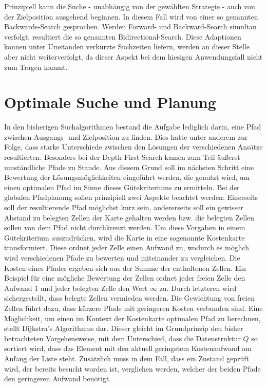 Prinzipiell kann die Suche - unabhängig von der gewählten Strategie - auch von der Zielposition ausgehend beginnen. In diesem Fall wird von einer so genannten Backwards-Search gesprochen. Werden Forward- und Backward-Search simultan verfolgt, resultiert die so genannten Bidirectional-Search. Diese Adaptionen können unter Umständen verkürzte Suchzeiten liefern, werden an dieser Stelle aber nicht weiterverfolgt, da dieser Aspekt bei dem hiesigen Anwendungsfall nicht zum Tragen kommt.

\section{Optimale Suche und Planung}
In den bisherigen Suchalgorithmen bestand die Aufgabe lediglich darin, eine Pfad zwischen Ausgangs- und Zielposition zu finden. Dies hatte unter anderem zur Folge, dass starke Unterschiede zwischen den Lösungen der verschiedenen Ansätze resultierten. Besonders bei der Depth-First-Search kamen zum Teil äußerst umständliche Pfade zu Stande. Aus diesem Grund soll im nächsten Schritt eine Bewertung der Lösungsmöglichkeiten eingeführt werden, die genutzt wird, um einen optimalen Pfad im Sinne dieses Gütekriteriums zu ermitteln. Bei der globalen Pfadplanung sollen prinzipiell zwei Aspekte beachtet werden: Einerseits soll der resultierende Pfad möglichst kurz sein, andererseits soll ein gewisser Abstand zu belegten Zellen der Karte gehalten werden bzw. die belegten Zellen sollen von dem Pfad nicht durchkreuzt werden. Um diese Vorgaben in einem Gütekriterium auszudrücken, wird die Karte in eine sogenannte Kostenkarte transformiert. Diese ordnet jeder Zelle einen Aufwand zu, wodurch es möglich wird verschiedenen Pfade zu bewerten und miteinander zu vergleichen. Die Kosten eines Pfades ergeben sich aus der Summe der enthaltenen Zellen. Ein Beispiel für eine mögliche Bewertung der Zellen ordnet jeder freien Zelle den Aufwand $1$ und jeder belegten Zelle den Wert $\infty$ zu. Durch letzteren wird sichergestellt, dass belegte Zellen vermieden werden. Die Gewichtung von freien Zellen führt dazu, dass kürzere Pfade mit geringeren Kosten verbunden sind. Eine Möglichkeit, um einen im Kontext der Kostenkarte optimalen Pfad zu berechnen, stellt Dijkstra's Algorithmus dar. Dieser gleicht im Grundprinzip den bisher betrachteten Vorgehensweise, mit dem Unterschied, dass die Datenstruktur $Q$ so sortiert wird, dass das Element mit den aktuell geringstem Kostenaufwand am Anfang der Liste steht. Zusätzlich muss in dem Fall, dass ein Zustand geprüft wird, der bereits besucht worden ist, verglichen werden, welcher der beiden Pfade den geringeren Aufwand benötigt.

